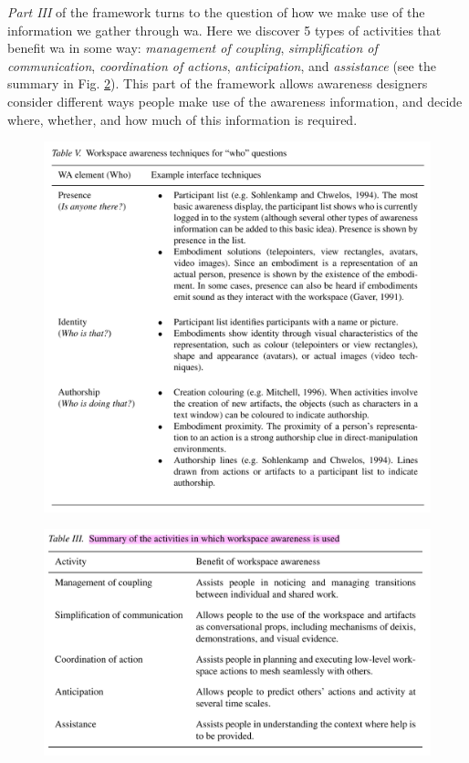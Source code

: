 \textit{Part III} of the framework turns to the question of how we make use of the information we gather through \gls{wa}. Here we discover 5 types of activities that benefit \gls{wa} in some way: \textit{management of coupling}, \textit{simplification of communication}, \textit{coordination of actions}, \textit{anticipation}, and \textit{assistance} (see the summary in Fig. \ref{fig:summaryofactivitieswherwacanbeused}).
This part of the framework allows awareness designers consider different ways people make use of the awareness information, and decide where, whether, and how much of this information is required.


\begin{figure}
	\centering
	\includegraphics[width=0.7\linewidth]{figures/placeholders/WA_techniques_for_WHO_questions}
	\caption{}
	\label{fig:watechniquesforwhoquestions}
\end{figure}

\begin{figure}
	\centering
	\includegraphics[width=0.7\linewidth]{figures/placeholders/summary_of_activities_wher_WA_can_be_used}
	\caption{}
	\label{fig:summaryofactivitieswherwacanbeused}
\end{figure}


